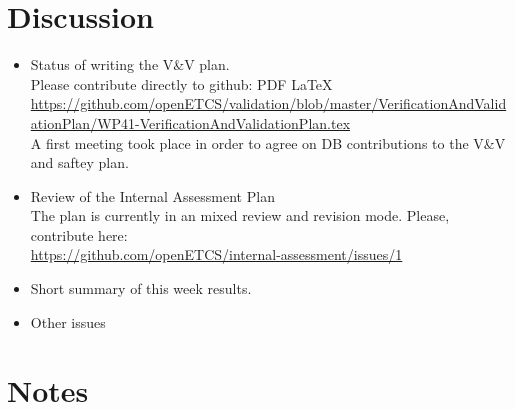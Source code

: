 \documentclass[a4paper, 11pt]{article}
\begin{document}
\section{Discussion}
\begin{itemize}

\item Status of writing the V\&V plan.\\
Please contribute directly to github: PDF LaTeX 
\url{https://github.com/openETCS/validation/blob/master/VerificationAndValidationPlan/WP41-VerificationAndValidationPlan.tex}\\
A first meeting took place in order to agree on DB contributions to the V\&V and saftey plan.

\item Review of the Internal Assessment Plan\\
The plan is currently in an mixed review and revision mode. Please, contribute here:\\
\url{https://github.com/openETCS/internal-assessment/issues/1}

\item Short summary of this week results.\\

\item Other issues


\end{itemize}


\section{Notes}
\end{document}
